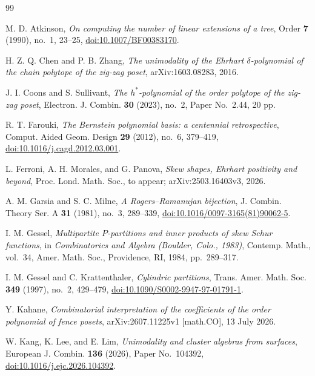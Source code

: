 \documentclass[11pt,letterpaper,reqno]{amsart}
\theoremstyle{definition}
\begin{document}
\begin{thebibliography}{99}

M. D. Atkinson,
\emph{On computing the number of linear extensions of a tree},
Order \textbf{7} (1990), no.~1, 23--25,
\href{https://doi.org/10.1007/BF00383170}{doi:10.1007/BF00383170}.

H. Z. Q. Chen and P. B. Zhang,
\emph{The unimodality of the Ehrhart \(\delta\)-polynomial of the chain polytope
of the zig-zag poset},
arXiv:1603.08283, 2016.

J. I. Coons and S. Sullivant,
\emph{The \(h^\ast\)-polynomial of the order polytope of the zig-zag poset},
Electron. J. Combin. \textbf{30} (2023), no.~2, Paper No.~2.44, 20 pp.

R. T. Farouki,
\emph{The Bernstein polynomial basis: a centennial retrospective},
Comput. Aided Geom. Design \textbf{29} (2012), no.~6, 379--419,
\href{https://doi.org/10.1016/j.cagd.2012.03.001}{doi:10.1016/j.cagd.2012.03.001}.

L. Ferroni, A. H. Morales, and G. Panova,
\emph{Skew shapes, Ehrhart positivity and beyond},
Proc. Lond. Math. Soc., to appear; arXiv:2503.16403v3, 2026.

A. M. Garsia and S. C. Milne,
\emph{A Rogers--Ramanujan bijection},
J. Combin. Theory Ser. A \textbf{31} (1981), no.~3, 289--339,
\href{https://doi.org/10.1016/0097-3165(81)90062-5}{doi:10.1016/0097-3165(81)90062-5}.

I. M. Gessel,
\emph{Multipartite \(P\)-partitions and inner products of skew Schur
functions},
in \emph{Combinatorics and Algebra (Boulder, Colo., 1983)},
Contemp. Math., vol.~34,
Amer. Math. Soc., Providence, RI, 1984, pp.~289--317.

I. M. Gessel and C. Krattenthaler,
\emph{Cylindric partitions},
Trans. Amer. Math. Soc. \textbf{349} (1997), no.~2, 429--479,
\href{https://doi.org/10.1090/S0002-9947-97-01791-1}{doi:10.1090/S0002-9947-97-01791-1}.

Y. Kahane,
\emph{Combinatorial interpretation of the coefficients of the order polynomial
of fence posets},
arXiv:2607.11225v1 [math.CO], 13 July 2026.

W. Kang, K. Lee, and E. Lim,
\emph{Unimodality and cluster algebras from surfaces},
European J. Combin. \textbf{136} (2026), Paper No.~104392,
\href{https://doi.org/10.1016/j.ejc.2026.104392}{doi:10.1016/j.ejc.2026.104392}.


\end{thebibliography}
\end{document}
